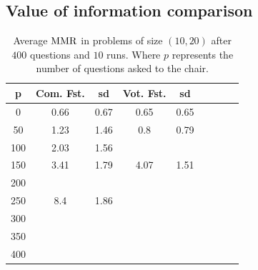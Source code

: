 \documentclass[sigconf, anonymous]{aamas}
\begin{document}
\subsection{Value of information comparison}
\begin{table}
	\begin{center}
		\begin{tabular}{S[table-figures-integer=3, table-number-alignment = right, table-figures-decimal=0]S[table-number-alignment = right]@{ ± }S[table-number-alignment = left]S[table-number-alignment = right]@{ ± }S[table-number-alignment = left]S[table-number-alignment = right]@{ ± }S[table-number-alignment = left]S[table-number-alignment = right]@{ ± }S[table-number-alignment = left]}
			\toprule
			{p} & {Com. Fst.} & {sd} & {Vot. Fst.} & {sd} \\
			 & 0.66 & 0.67 & 0.65 & 0.65  \\
			50 & 1.23 & 1.46 & 0.8 & 0.79 \\
			100 & 2.03 & 1.56 &  &  \\
			150 & 3.41 & 1.79 & 4.07 & 1.51 \\
			200 &   &  &  &  \\
			250 & 8.4 & 1.86 & 	& \\
			300 &&&& \\
			350 &&&& \\
			400 &&&& \\
			\bottomrule
		\end{tabular}
	\end{center}
	\caption{Average $\operatorname{MMR}$ in problems of size $(10, 20)$ after $400$ questions and $10$ runs. Where $p$ represents the number of questions asked to the chair.}
	\label{tab:twoP400}
\end{table}


\end{document}

